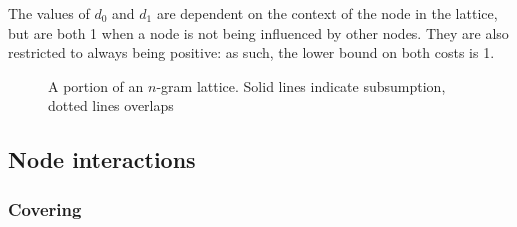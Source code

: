 \documentclass[11pt,letterpaper]{article}
\begin{document}
The values of $d_0$ and $d_1$ are dependent on the context of the node in the lattice, but are both 1 when a node is not being influenced by other nodes. They are also restricted to always being positive: as such, the lower bound on both costs is 1.





\begin{figure}[!tb]
\caption{A portion of an $n$-gram lattice. Solid lines indicate subsumption, dotted lines overlaps}
\label{fig:example}
\end{figure}

\subsection{Node interactions}

\subsubsection{Covering}
\end{document}

